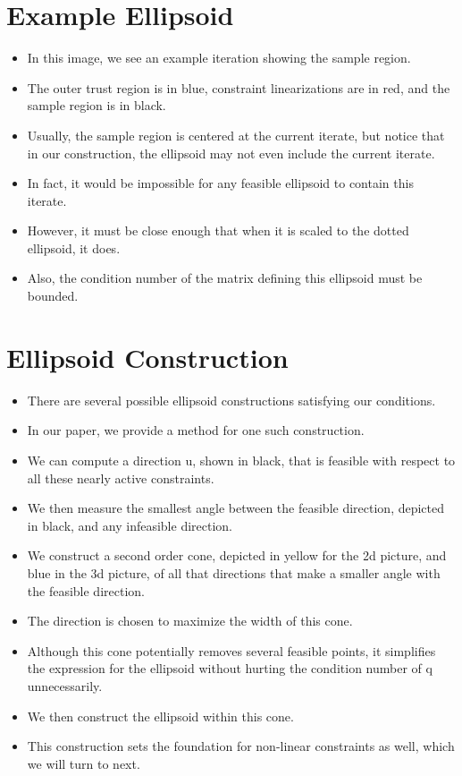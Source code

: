 \documentclass{article}
\begin{document}
	\section{Example Ellipsoid}
\begin{itemize}
\item In this image, we see an example iteration showing the sample region.
\item The outer trust region is in blue, constraint linearizations are in red, and the sample region is in black.
\item Usually, the sample region is centered at the current iterate, but notice that in our construction, the ellipsoid may not even include the current iterate.
\item In fact, it would be impossible for any feasible ellipsoid to contain this iterate.
\item However, it must be close enough that when it is scaled to the dotted ellipsoid, it does.
\item Also, the condition number of the matrix defining this ellipsoid must be bounded.
\end{itemize}


	\section{Ellipsoid Construction}
\begin{itemize}
\item There are several possible ellipsoid constructions satisfying our conditions.
\item In our paper, we provide a method for one such construction.
\item We can compute a direction u, shown in black, that is feasible with respect to all these nearly active constraints.
\item We then measure the smallest angle between the feasible direction, depicted in black, and any infeasible direction.
\item We construct a second order cone, depicted in yellow for the 2d picture, and blue in the 3d picture, of all that directions that make a smaller angle with the feasible direction.
\item The direction is chosen to maximize the width of this cone.
\item Although this cone potentially removes several feasible points, it simplifies the expression for the ellipsoid without hurting the condition number of q unnecessarily.
\item We then construct the ellipsoid within this cone.
\item This construction sets the foundation for non-linear constraints as well, which we will turn to next.
\end{itemize}
\end{document}
